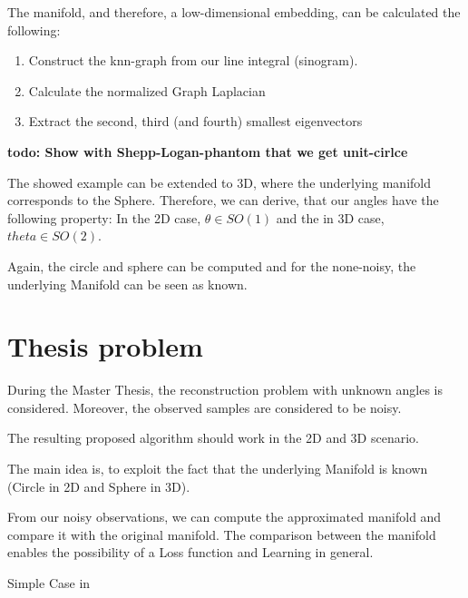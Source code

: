 The manifold, and therefore, a low-dimensional embedding, can be calculated the following:

\begin{enumerate}
    \item Construct the knn-graph from our line integral (sinogram).
    \item Calculate the normalized Graph Laplacian
    \item Extract the second, third (and fourth) smallest eigenvectors
\end{enumerate}

\textbf{todo: Show with Shepp-Logan-phantom that we get unit-cirlce}

The showed example can be extended to 3D, where the underlying manifold corresponds to the Sphere.
Therefore, we can derive, that our angles have the following property:
In the 2D case, $\theta \in SO(1)$ and the in 3D case, $theta \in SO(2)$.

Again, the circle and sphere can be computed and for the none-noisy, the underlying Manifold can be seen as known.


\section{Thesis problem}
During the Master Thesis, the reconstruction problem with unknown angles is considered. 
Moreover, the observed samples are considered to be noisy. 

The resulting proposed algorithm should work in the 2D and 3D scenario.

The main idea is, to exploit the fact that the underlying Manifold is known (Circle in 2D and Sphere in 3D). 

From our noisy observations, we can compute the approximated manifold and compare it with the original manifold.
The comparison between the manifold enables the possibility of a Loss function and Learning in general.




Simple Case in 
